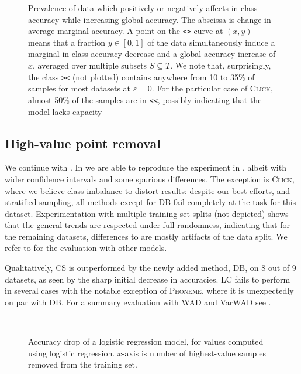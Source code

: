 \documentclass[10pt]{article}
\newcommand{\tmname}[1]{\textsc{#1}}
\newcommand{\tmtt}[1]{\texttt{#1}}
\begin{document}
\begin{figure}[h]
  \caption{\label{fig:dataset-characteristics}Prevalence of data which
  positively or negatively affects in-class accuracy while increasing global
  accuracy. The abscissa is change in average marginal accuracy. A point on
  the {\tmtt{<>}} curve at $(x, y)$ means that a fraction $y \in [0, 1]$ of
  the data simultaneously induce a marginal in-class accuracy decrease and a
  global accuracy increase of $x$, averaged over multiple subsets $S \subseteq
  T$. We note that, surprisingly, the class {\tmtt{><}} (not plotted) contains
  anywhere from 10 to 35\% of samples for most datasets at $\varepsilon = 0$.
  For the particular case of {\tmname{Click}}, almost 50\% of the samples are
  in {\tmtt{<<}}, possibly indicating that the model lacks capacity}
\end{figure}

\subsection{High-value point removal}\label{sec:high-value}

We continue with . In  we are
able to reproduce the experiment in {\cite{schoch_csshapley_2022}}, albeit
with wider confidence intervals and some spurious differences. The exception
is {\tmname{Click}}, where we believe class imbalance to distort results:
despite our best efforts, and stratified sampling, all methods except for DB
fail completely at the task for this dataset. Experimentation with multiple
training set splits (not depicted) shows that the general trends are respected
under full randomness, indicating that for the remaining datasets, differences
to {\cite{schoch_csshapley_2022}} are mostly artifacts of the data split. We
refer to  for the evaluation with other models.

Qualitatively, CS is outperformed by the newly added method, DB, on 8 out of 9
datasets, as seen by the sharp initial decrease in accuracies. LC fails to
perform in several cases with the notable exception of {\tmname{Phoneme}},
where it is unexpectedly on par with DB. For a summary evaluation with WAD and
VarWAD see .

\begin{figure}[h]
  \
  \caption{\label{fig:acc-lr-lr}Accuracy drop of a logistic regression model,
  for values computed using logistic regression. $x$-axis is number of
  highest-value samples removed from the training set.}
\end{figure}
\end{document}
